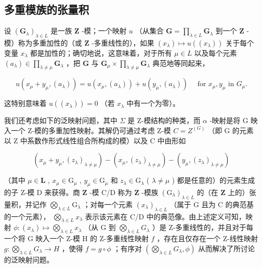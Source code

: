 \subsection{多重模族的张量积}

设 \((\mathbf{G}_{\lambda})_{\lambda \in L}\) 是一族 \(\mathbf{Z}\) -模；一个映射 \(u\) （从集合 \(\mathbf{G} = \prod_{\lambda \in L} \mathbf{G}_{\lambda}\) 到一个 \(\mathbf{Z}\) -模）称为多重加性的（或 \(\mathbf{Z}\) -多重线性的），如果 \((x_{\lambda}) \mapsto u((x_{\lambda}))\) 关于每个变量 \(x_{\lambda}\) 都是加性的；确切地说，这意味着，对于所有 \(\mu \in L\) 以及每个元素 \((a_{\lambda}) \in \prod_{\lambda \neq \mu} \mathbf{G}_{\lambda}\) ，把 \(\mathbf{G}\) 与 \(\mathbf{G}_{\mu} \times \prod_{\lambda \neq \mu} \mathbf{G}_{\lambda}\) 典范地等同起来，

\[
u (x _ {\mu} + y _ {\mu}, (a _ {\lambda})) = u (x _ {\mu}, (a _ {\lambda})) + u (y _ {\mu}, (a _ {\lambda})) \quad \text { for } x _ {\mu}, y _ {\mu} \text { in } G _ {\mu}.\tag{24}
\]

这特别意味着 \(u((x_{\lambda})) = 0\) （若 \(x_{\lambda}\) 中有一个为零）。

我们还考虑如下的泛映射问题，其中 \(\Sigma\) 是 Z-模结构的种类，而 \(\alpha\) -映射是将 G 映入一个 Z-模的多重加性映射。其解仍可通过考虑 Z-模 \(C = Z^{(G)}\) （即 G 的元素以 Z 中系数作形式线性组合所构成的模）以及 C 中由形如

\[
\left(x _ {\mu} + y _ {\mu}, \left(z _ {\lambda}\right) _ {\lambda \neq \mu}\right) - \left(x _ {\mu}, \left(z _ {\lambda}\right) _ {\lambda \neq \mu}\right) - \left(y _ {\mu}, \left(z _ {\lambda}\right) _ {\lambda \neq \mu}\right)
\]

（其中 \(\mu \in \mathbf{L}\) , \(x_{\mu} \in \mathrm{G}_{\mu}\) , \(y_{\mu} \in \mathrm{G}_{\mu}\) 和 \(z_{\lambda} \in \mathrm{G}_{\lambda}\) ( \(\lambda \neq \mu\) ) 都是任意的）的元素生成的子 Z-模 D 来获得。商 \(\mathbf{Z}\) -模 C/D 称为 \(\mathbf{Z}\) -模族 \((\mathrm{G}_{\lambda})_{\lambda \in L}\) 的（在 \(\mathbf{Z}\) 上的）张量积，并记作 \(\bigotimes_{\lambda \in L} \mathrm{G}_{\lambda}\) ；对每一个元素 \((x_{\lambda})_{\lambda \in L}\) （属于 G 且为 C 的典范基的一个元素）， \(\bigotimes_{\lambda \in L} x_{\lambda}\) 表示该元素在 C/D 中的典范像。由上述定义可知，映射 \(\phi: (x_{\lambda}) \mapsto \bigotimes_{\lambda \in L} x_{\lambda}\) （从 G 到 \(\bigotimes_{\lambda \in L} G_{\lambda}\) ）是 Z-多重线性的，并且对于每一个将 G 映入一个 Z-模 H 的 Z-多重线性映射 \(f\) ，存在且仅存在一个 Z-线性映射 \(g: \bigotimes_{\lambda \in L} G_{\lambda} \to H\) ，使得 \(f = g \circ \phi\) ；有序对 \(\left( \bigotimes_{\lambda \in L} G_{\lambda}, \phi \right)\) 从而解决了所讨论的泛映射问题。

